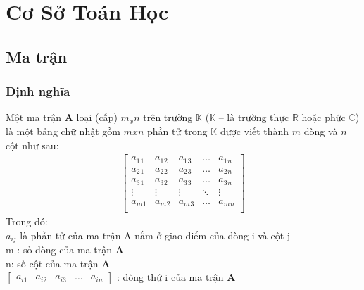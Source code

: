 %
%
%
%
%
\everymath{\displaystyle}  
\chapter{Cơ Sở Toán Học}
\label{chap:chap3}
\section{Ma trận}
\subsection{Định nghĩa}
 Một ma trận \textbf{A} loại (cấp) $m_x n$ trên trường $\mathbb{K}$ ($\mathbb{K}$ – là trường thực $\mathbb{R}$ hoặc phức $\mathbb{C}$) là một bảng chữ nhật gồm $m x n$ phần tử trong $\mathbb{K}$ được viết thành $m$ dòng và $n$ cột như sau:
\begin{align*}
	\begin{bmatrix}
		a_1{}_1 & a_1{}_2 & a_1{}_3  &\ldots& a_1{}_n \\
		a_2{}_1 & a_2{}_2 & a_2{}_3  & \ldots & a_2{}_n \\
		a_3{}_1 & a_3{}_2 & a_3{}_3  & \ldots & a_3{}_n \\
		\vdots & \vdots& \vdots  & \ddots& \vdots\\			
		a_m{}_1 & a_m{}_2 & a_m{}_3 &\ldots& a_m{}_n \\
	\end{bmatrix}	
\end{align*}
Trong đó: \\ 

	 $a_{ij}$ là phần tử của ma trận A nằm ở giao điểm của dòng i và cột j\\
	
	 m : số dòng của ma trận \textbf{A}\\
	
	 n: số cột của ma trận \textbf{A}\\
	
	 
$	\begin{bmatrix}
		a_{i1} & a_{i2}& a_{i3}&\ldots& a_{in}			
	\end{bmatrix}$ : 
	dòng thứ i của ma trận \textbf{A}\\
	
